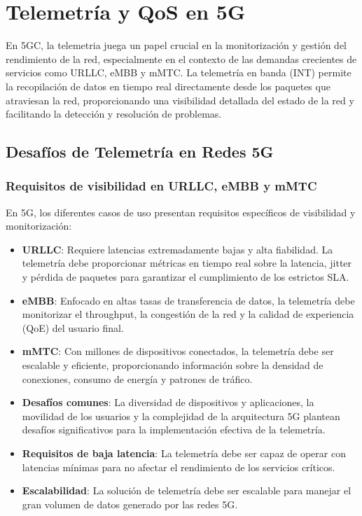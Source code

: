 \chapter{Telemetría y QoS en 5G}
En 5GC, la telemetria juega un papel crucial en la monitorización y gestión del rendimiento de la red, especialmente en el contexto de las demandas crecientes de servicios como URLLC, eMBB y mMTC. La telemetría en banda (INT) permite la recopilación de datos en tiempo real directamente desde los paquetes que atraviesan la red, proporcionando una visibilidad detallada del estado de la red y facilitando la detección y resolución de problemas.

\section{Desafíos de Telemetría en Redes 5G}
\subsection{Requisitos de visibilidad en URLLC, eMBB y mMTC}
En 5G, los diferentes casos de uso presentan requisitos específicos de visibilidad y monitorización:
\begin{itemize}
    \item \textbf{URLLC}: Requiere latencias extremadamente bajas y alta fiabilidad. La telemetría debe proporcionar métricas en tiempo real sobre la latencia, jitter y pérdida de paquetes para garantizar el cumplimiento de los estrictos SLA.
    \item \textbf{eMBB}: Enfocado en altas tasas de transferencia de datos, la telemetría debe monitorizar el throughput, la congestión de la red y la calidad de experiencia (QoE) del usuario final.
    \item \textbf{mMTC}: Con millones de dispositivos conectados, la telemetría debe ser escalable y eficiente, proporcionando información sobre la densidad de conexiones, consumo de energía y patrones de tráfico.
    \item \textbf{Desafíos comunes}: La diversidad de dispositivos y aplicaciones, la movilidad de los usuarios y la complejidad de la arquitectura 5G plantean desafíos significativos para la implementación efectiva de la telemetría.
    \item \textbf{Requisitos de baja latencia}: La telemetría debe ser capaz de operar con latencias mínimas para no afectar el rendimiento de los servicios críticos.
    \item \textbf{Escalabilidad}: La solución de telemetría debe ser escalable para manejar el gran volumen de datos generado por las redes 5G.
\end{itemize}
